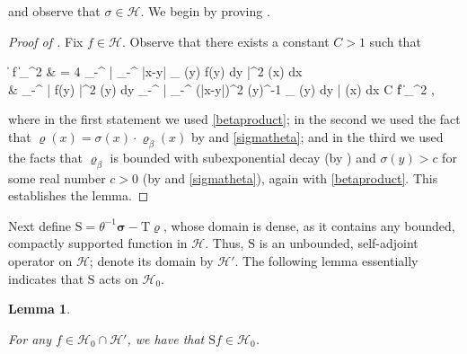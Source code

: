\documentclass{amsart}
\numberwithin{equation}{section}
\newtheorem{lem}[thm]{Lemma}
\theoremstyle{remark}
\theoremstyle{definition}
\begin{document}
	\noindent and observe that $\sigma \in \mathcal{H}$. We begin by proving .
	
	
	\begin{proof}[Proof of ]
		
		Fix $f \in \mathcal{H}$. Observe that there exists a constant $C>1$ such that 
		\begin{flalign*}
			\|  f \|_{}^2 & = 4 \displaystyle\int_{-\infty}^{\infty} \bigg| \displaystyle\int_{-\infty}^{\infty} \log |x-y|  \cdot \varrho_{\beta} (y) f(y) dy \bigg|^2 \varrho (x) dx \\
			&  \displaystyle\int_{-\infty}^{\infty} | f(y) |^2 \varrho (y) dy \cdot  \displaystyle\int_{-\infty}^{\infty}  \Bigg| \displaystyle\int_{-\infty}^{\infty} (\log |x-y|)^2 \sigma (y)^{-1} \varrho_{\beta} (y) dy \Bigg| \cdot \varrho (x) dx \le C \cdot \| f \|_{}^2 ,
		\end{flalign*}
		
		\noindent where in the first statement we used \eqref{betaproduct}; in the second we used the fact that $\varrho (x) = \sigma (x) \cdot \varrho_{\beta} (x)$ by  and \eqref{sigmatheta}; and in the third we used the facts that $\varrho_{\beta}$ is bounded with subexponential decay (by ) and $\sigma (y) > c$ for some real number $c>0$ (by  and \eqref{sigmatheta}), again with \eqref{betaproduct}. This establishes the lemma.
	\end{proof}
	
	
	Next define $\bm{\mathrm{S}} = \theta^{-1} \bm{\sigma} - \bm{\mathrm{T} \varrho}$, whose domain is dense, as it contains any bounded, compactly supported function in $\mathcal{H}$. Thus, $\bm{\mathrm{S}}$ is an unbounded, self-adjoint operator on $\mathcal{H}$; denote its domain by $\mathcal{H}'$. The following lemma essentially indicates that $\bm{\mathrm{S}}$ acts on $\mathcal{H}_0$.
	
	
	\begin{lem} 
		
		\label{gbetat}
		
		For any $f \in \mathcal{H}_0 \cap \mathcal{H}'$, we have that $\bm{\mathrm{S}} f \in \mathcal{H}_0$.
	\end{lem} 
	
\end{document}
